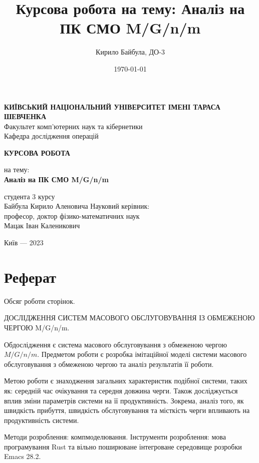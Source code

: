 \documentclass[14pt]{extarticle}
\author{Кирило Байбула, ДО-3}
\date{\today}
\title{Курсова робота на тему: Аналіз на ПК СМО M/G/n/m}
\begin{document}

\begin{titlepage}
\begin{center}
\textbf{КИЇВСЬКИЙ НАЦІОНАЛЬНИЙ УНІВЕРСИТЕТ ІМЕНІ ТАРАСА ШЕВЧЕНКА} \\
Факультет комп'ютерних наук та кібернетики \\
Кафедра дослідження операцій \\
\vspace{2cm}
{\Large \textbf{КУРСОВА РОБОТА} \par}
на тему: \\
\textbf{Аналіз на ПК СМО M/G/n/m} \\
\vspace{2cm}
{\large }
\end{center}
\begin{flushright}
\vfill
студента 3 курсу \\
Байбула Кирило Аленовича
\vfill
Науковий керівник: \\
професор, доктор фізико-математичних наук \\
Мацак Іван Каленикович
\end{flushright}
\vfill
\begin{center}
Київ --- 2023
\end{center}
\end{titlepage}

\section*{Реферат}

Обсяг роботи \pageref{LastPage} сторінок.

ДОСЛІДЖЕННЯ СИСТЕМ МАСОВОГО ОБСЛУГОВУВАННЯ ІЗ ОБМЕЖЕНОЮ ЧЕРГОЮ M/G/n/m.

Об дослідження є система масового обслуговування з обмеженою чергою
\(M/G/n/m\). Предметом роботи є розробка імітаційної моделі системи масового
обслуговування з обмеженою чергою та аналіз результатів її роботи.

Метою роботи є знаходження загальних характеристик подібної системи, таких як:
середній час очікування та середня довжина черги. Також досліджується вплив
зміни параметрів системи на її продуктивність. Зокрема, аналіз того, як
швидкість прибуття, швидкість обслуговування та місткість черги впливають на
продуктивність системи.

Методи розроблення: комп моделювання. Інструменти
розроблення: мова програмування Rust та вільно поширюване інтегроване середовище
розробки Emacs 28.2.
\end{document}
